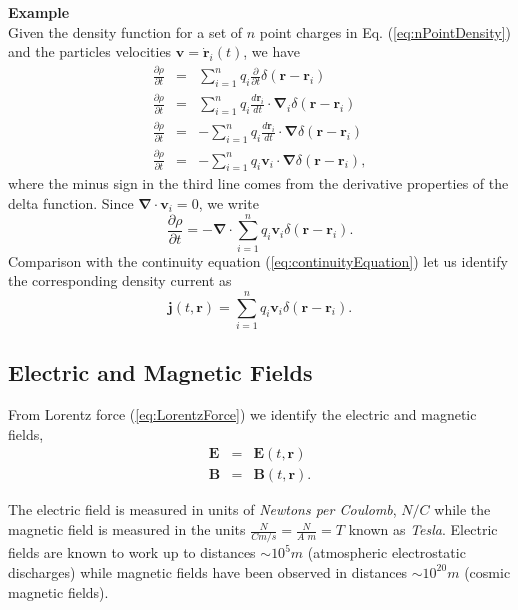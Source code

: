 \textbf{Example}\\
Given the density function for a set of $n$ point charges in Eq. (\ref{eq:nPointDensity}) and the particles velocities $\textbf{v} = \dot{\textbf{r}}_i (t) $, we have
\begin{eqnarray}
\frac{\partial \rho}{\partial t} &=& \sum_{i=1}^n q_i \frac{\partial}{\partial t} \delta (\textbf{r} - \textbf{r}_i)\\
\frac{\partial \rho}{\partial t} &=& \sum_{i=1}^n q_i \frac{d \textbf{r}_i}{d t} \cdot \boldsymbol{\nabla}_i \delta (\textbf{r} - \textbf{r}_i)\\
\frac{\partial \rho}{\partial t} &=& -\sum_{i=1}^n q_i \frac{d \textbf{r}_i}{d t} \cdot \boldsymbol{\nabla} \delta (\textbf{r} - \textbf{r}_i)\\
\frac{\partial \rho}{\partial t} &=& -\sum_{i=1}^n q_i \textbf{v}_i \cdot \boldsymbol{\nabla} \delta (\textbf{r} - \textbf{r}_i),
\end{eqnarray}
where the minus sign in the third line comes from the derivative properties of the delta function. Since $\boldsymbol{\nabla} \cdot \textbf{v}_i = 0 $, we write
\begin{equation}
\frac{\partial \rho}{\partial t}=-  \boldsymbol{\nabla} \cdot \sum_{i=1}^n q_i \textbf{v}_i  \delta (\textbf{r} - \textbf{r}_i).
\end{equation}
Comparison with the continuity equation (\ref{eq:continuityEquation}) let us identify the corresponding density current as 
\begin{equation}
\textbf{j} (t,\textbf{r}) = \sum_{i=1}^n q_i \textbf{v}_i  \delta (\textbf{r} - \textbf{r}_i).
\end{equation}


\subsection{Electric and Magnetic Fields}
From Lorentz force (\ref{eq:LorentzForce}) we identify the electric and magnetic fields,
\begin{eqnarray}
\textbf{E} &=& \textbf{E}(t,\textbf{r})\\
\textbf{B} &=& \textbf{B}(t,\textbf{r}).
\end{eqnarray}

The electric field is measured in units of \textit{Newtons per Coulomb}, $\textit{N}/\textit{C}$ while the magnetic field is measured in the units $\frac{\textit{N}}{\textit{C} \textit{m/s}} = \frac{\textit{N}}{\textit{A m} } = T$ known as \textit{Tesla}.
Electric fields are known to work up to distances $\sim 10^5 \textit{m}$ (atmospheric electrostatic discharges) while magnetic fields have been observed in distances $\sim 10^{20} \textit{m} $ (cosmic magnetic fields).


